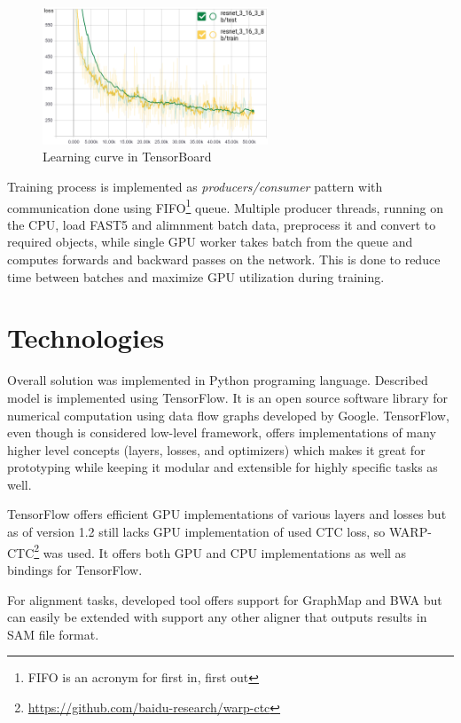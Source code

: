 \documentclass[times, utf8, diplomski, numeric, english]{fer}
\begin{document}
\begin{figure}[!ht]
	\begin{center}
		\includegraphics[width=0.6\textwidth]{./imgs/train_tb.png}
		\caption{Learning curve in TensorBoard}
		\label{fg:learn}
	\end{center}
\end{figure}

Training process is implemented as \textit{producers/consumer} pattern with communication done using FIFO\footnote{FIFO is an acronym for first in, first out} queue. Multiple producer threads, running on the CPU, load FAST5 and alimnment batch data, preprocess it and convert to required objects, while single GPU worker takes batch from the queue and computes forwards and backward passes on the network. This is done to reduce time between batches and maximize GPU utilization during training. 


\section{Technologies}
\label{sec:tech}
Overall solution was implemented in Python programing language. Described model is implemented using TensorFlow. It is an open source software library for numerical computation using data flow graphs developed by Google. TensorFlow, even though is considered low-level framework, offers implementations of many higher level concepts (layers, losses, and optimizers) which makes it great for prototyping while keeping it modular and extensible for highly specific tasks as well.

TensorFlow offers efficient GPU implementations of various layers and losses but as of version 1.2 still lacks GPU implementation of used CTC loss, so WARP-CTC\footnote{\url{https://github.com/baidu-research/warp-ctc}} was used. It offers both GPU and CPU implementations as well as bindings for TensorFlow.

For alignment tasks, developed tool offers support for GraphMap and BWA but can easily be extended with support any other aligner that outputs results in SAM file format.
\end{document}
